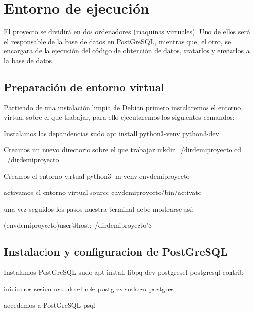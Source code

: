 \section{Entorno de ejecución}
El proyecto se dividirá en dos ordenadores (maquinas virtuales). Uno de ellos será el responsable de la base de datos en PostGreSQL, mientras que, el otro, se encargara de la ejecución del código de obtención de datos, tratarlos y enviarlos a la base de datos.

\subsection{Preparación de entorno virtual}
Partiendo de una instalación limpia de Debian primero instalaremos el entorno virtual sobre el que trabajar, para ello ejecutaremos los siguientes comandos:

Instalamos las depandencias
sudo apt install python3-venv python3-dev

Creamos un nuevo directorio sobre el que trabajar
mkdir ~/dirdemiproyecto
cd ~/dirdemiproyecto

Creamos el entorno virtual
python3 -m venv envdemiproyecto

activamos el entorno virtual
source envdemiproyecto/bin/activate

una vez seguidos los pasos nuestra terminal debe mostrarse así:

(envdemiproyecto)user@host:~/dirdemiproyecto'\$

\subsection{Instalacion y configuracion de PostGreSQL}
Instalamos PostGreSQL
sudo apt install libpq-dev postgresql postgresql-contrib

iniciamos sesion usando el role postgres
sudo -u postgres

accedemos a PostGreSQL
psql
